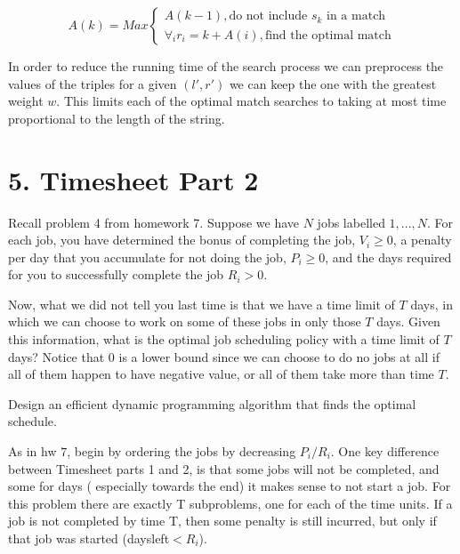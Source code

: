 \documentclass[11pt]{article}
\begin{document}
\begin{displaymath}
  A(k) = Max  \left\{
     \begin{array}{lr}
       A(k-1),\mbox{do not include $s_k$ in a match}\\
       \forall_i r_i=k + A(i),\mbox{find the optimal match}
     \end{array}
   \right.
\end{displaymath}

In order to reduce the running time of the search process we can preprocess the values of the triples for a given $(l',r')$ we can keep
the one with the greatest weight $w$. This limits each of the optimal match searches to taking at most time proportional to the length of the string.


\label{pg:end-of-p4}

%


\newpage

\section*{5. Timesheet Part 2}

Recall problem 4 from homework 7.
Suppose we have $N$ jobs labelled $1,...,N$. For each job, you have determined the bonus of
 completing the job, $V_i \geq 0$, a penalty per day that you accumulate for not doing the job,
$ P_i ≥ 0$, and the days required for you to successfully complete the job $R_i > 0$.

Now, what we did not tell you last time is that we have a time limit of $T$ days, in which we can
 choose to work on some of these jobs in only those $T$ days. Given this information, what is the optimal
 job scheduling policy with a time limit of $T$ days? 
Notice that 0 is a lower bound since we can choose to do no jobs at all if all of them 
happen to have negative value, or all of them take more than time $T$.

Design an efficient dynamic programming algorithm that finds the optimal schedule.

As in hw $7$, begin by ordering the jobs by decreasing $P_i/R_i$. 
One key difference between Timesheet parts 1 and 2, is that some jobs will not be completed, and some for days (
especially towards the end) it makes sense to not start a job. For this problem there are exactly T subproblems, one for 
each of the time units. If a job is not completed by time T, then some penalty is still incurred, but only if that job
was started (daysleft$ < R_i$).
\end{document}
